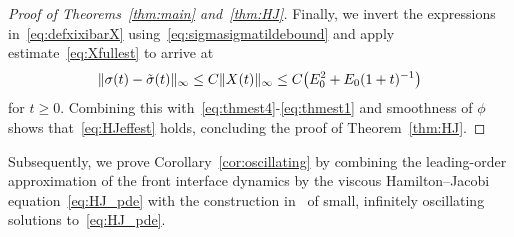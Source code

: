 \documentclass[12pt,oneside,a4paper,reqno]{amsart}
\numberwithin{equation}{section}
\theoremstyle{definition}
\theoremstyle{remark}
\DeclarePairedDelimiter{\norm}{\lVert}{\rVert}
\begin{document}
\begin{proof}[Proof of Theorems~\ref{thm:main} and~\ref{thm:HJ}]
    Finally, we invert the expressions in~\eqref{eq:defxixibarX} using~\eqref{eq:sigmasigmatildebound} and apply estimate~\eqref{eq:Xfullest} to arrive at
    \begin{align*}
        \norm{\sigma(t) - \tilde{\sigma}(t)}_{\infty} \leq C\norm{X(t)}_{\infty} \leq C \big(E_0^2 + E_0 (1+t)^{-1}\big)
    \end{align*}
    for $t \geq 0$. Combining this with~\eqref{eq:thmest4}-\eqref{eq:thmest1} and smoothness of $\phi$ shows that~\eqref{eq:HJeffest} holds, concluding the proof of Theorem~\ref{thm:HJ}.
\end{proof}

Subsequently, we prove Corollary~\ref{cor:oscillating} by combining the leading-order approximation of the front interface dynamics by the viscous Hamilton--Jacobi equation~\eqref{eq:HJ_pde} with the construction in~\cite[\S\,3]{matano_stability_2009} of small, infinitely oscillating solutions to~\eqref{eq:HJ_pde}.
\end{document}
